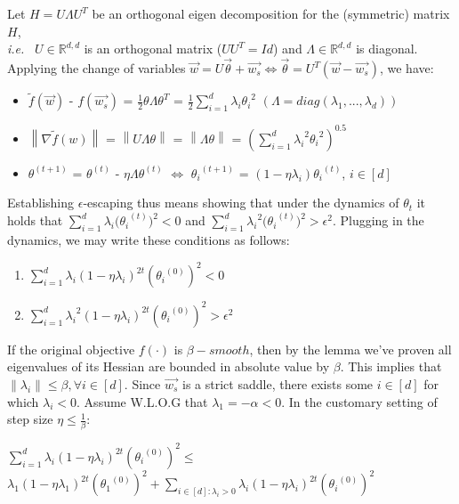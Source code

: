 \documentclass[12pt]{article}
\newcommand{\norm}[1]{\left\| #1 \right\|}
\newcommand{\ie}{{\it i.e. }}
\begin{document}
    Let $H = U \Lambda U^T$ be an orthogonal eigen decomposition for the (symmetric) matrix $H$,
    \\\ie\ $U\in\mathbb{R}^{d,d}$ is an orthogonal matrix ($UU^T=Id$) and $\Lambda\in\mathbb{R}^{d,d}$ is diagonal. Applying the change of variables $\overrightarrow{w} = U\overrightarrow{\theta} +\overrightarrow{w_s} \Longleftrightarrow \overrightarrow{\theta} = U^T(\overrightarrow{w} - \overrightarrow{w_s})$, we have:
	\begin{itemize}
      \item $\tilde{f}(\overrightarrow{w})$ - ${f}(\overrightarrow{w_s})$ = $\frac{1}{2}{\theta}\Lambda{\theta}^T$ = $\frac{1}{2}\sum_{i=1}^{d} \lambda_i{\theta_i}^{2}$  $(\Lambda=diag(\lambda_1, ..., \lambda_d))$
      \item $\left\lVert \nabla\tilde{f}(w) \right\lVert$ = $\left\lVert U\Lambda{\theta} \right\lVert$ = $\left\lVert \Lambda{\theta} \right\lVert$ = $({\sum_{i=1}^{d} {\lambda_i}^{2}{\theta_i}^{2}})^{0.5}$
      \item ${\theta}^{(t+1)}$ = ${\theta}^{(t)}$ - $\eta\Lambda{\theta}^{(t)}$ $\Longleftrightarrow$ ${\theta_i}^{(t+1)}$ = $(1-\eta\lambda_i){\theta_i}^{(t)}$, $i \in[d]$
    \end{itemize}
    Establishing ${\epsilon}$-escaping thus means showing that under the dynamics of ${\theta_t}$ it holds that ${\sum_{i=1}^{d} {\lambda_i}{(\theta_i}^{(t)})^{2}} < 0 $ and ${\sum_{i=1}^{d} {\lambda_i}^{2}{(\theta_i}^{(t)})^{2}} > {\epsilon^{2}} $. Plugging in the dynamics, we may write these conditions as follows:
    
    \begin{enumerate}
      \item ${\sum_{i=1}^{d} {\lambda_i}{(1 - \eta\lambda_i)}^{2t}}{({\theta_i}^{(0)})}^{2} < 0 $
      \item ${\sum_{i=1}^{d} {{\lambda_i}^{2}}{(1 - \eta\lambda_i)}^{2t}}{({\theta_i}^{(0)})}^{2} > {{\epsilon}^{2}} $
    \end{enumerate}
    If the original objective $f(\cdot)$ is $\beta-smooth$, then by the lemma we've proven all eigenvalues of its Hessian are bounded in absolute value by $\beta$. This implies that $\norm {\lambda_i} \leq \beta , \forall {i \in [d]}$.
    Since $\overrightarrow{w_s}$ is a strict saddle, there exists some ${i \in [d]}$ for which ${\lambda_i} < 0 $. Assume W.L.O.G that ${\lambda_1} = -\alpha < 0 $. In the customary setting of step size $\eta \leq \frac{1}{\beta}$:
    
    ${\sum_{i=1}^{d} {\lambda_i}{(1 - \eta\lambda_i)}^{2t}{({\theta_i}^{(0)})}^{2}} \leq  $ $ {\lambda_1}{(1 - \eta\lambda_1)}^{2t}{({\theta_1}^{(0)})}^{2} + {\sum_{i\in[d]: {\lambda_i > 0}} {\lambda_i}{(1 - \eta\lambda_i)}^{2t}{({\theta_i}^{(0)})}^{2}}  $
    
\end{document}
